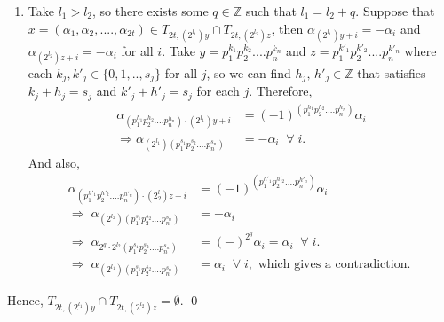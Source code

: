 \documentclass[a4paper,12pt]{amsart}
\renewenvironment{proof}{{\bfseries Proof.}}{\qed}
\numberwithin{equation}{section}
\theoremstyle{definition}
\newcommand{\imp}{\Rightarrow}
\numberwithin{equation}{section}
\begin{document}
\begin{proof}
\begin{enumerate}
    \item Take $l_1>l_2$, so there exists some $q \in \mathbb{Z} $ such that $ l_1=l_2+q$. Suppose that $x=(\alpha_1,\alpha_2,....,\alpha_{2t}) \in T_{2t,(2^{l_1})y} \cap T_{2t,(2^{l_2})z}$, then $\alpha_{(2^{l_1})y +i }= -\alpha_i$ and $\alpha_{(2^{l_2})z + i}=-\alpha_i$ for all $i$. Take $y=p_1^{k_1}p_2^{k_2}....p_n^{k_n}$ and $z=p_1^{k'_1}p_2^{k'_2}....p_n^{k'_n}$ where each $k_j, k'_j \in \{0,1,.., s_j\}$ for all $j$, so we can find $h_j,\, h'_j \in \mathbb{Z}$ that satisfies $k_j + h_j=s_j$ and $k'_j+h'_j=s_j$ for each $j$. Therefore,
    \begin{align*}\alpha_{(p_1^{h_1}p_2^{h_2}....p_n^{h_n})\cdot (2^{l_1})y + i} &=(-1)^{(p_1^{h_1}p_2^{h_2}....p_n^{h_n})}\alpha_i\\
    \imp \alpha_{(2^{l_1})(p_1^{s_1}p_2^{s_2}....p_n^{s_n})} &= -\alpha_i \;\;\forall\;i.
    \end{align*}And also,
    \begin{align*}
    \alpha_{(p_1^{h'_1}p_2^{h'_2}....p_n^{h'_n})\cdot (2^l_{2})z + i} & =(-1)^{(p_1^{h'_1}p_2^{h'_2}....p_n^{h'_n})}\alpha_i \\
    \imp\; \alpha_{(2^{l_2})(p_1^{s_1}p_2^{s_2}....p_n^{s_n})} &= -\alpha_i \\
    \imp\; \alpha_{2^q\cdot2^{l_2}(p_1^{s_1}p_2^{s_2}....p_n^{s_n})}&=(-)^{2^q}\alpha_i=\alpha_i\;\;\forall\;i.\\
    \imp\; \alpha_{(2^{l_1})(p_1^{s_1}p_2^{s_2}....p_n^{s_n})} &= \alpha_i\;\;\forall\;i, \text{ which gives a contradiction. }
    \end{align*} \end{enumerate}
    Hence, $T_{2t,(2^{l_1})y} \cap T_{2t,(2^{l_2})z} = \emptyset.$ 
\end{proof}
\end{document}
